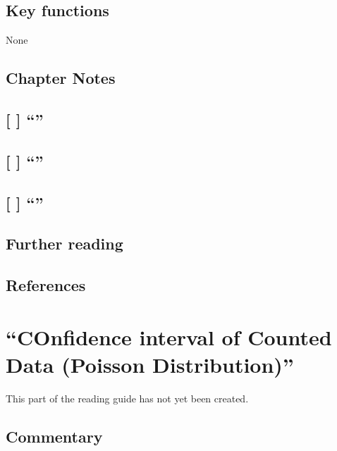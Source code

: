 \documentclass[]{book}
\theoremstyle{definition}
\theoremstyle{definition}
\theoremstyle{definition}
\theoremstyle{remark}
\begin{document}
\section*{Key functions}\label{key-functions-3}

None

\section*{Chapter Notes}\label{chapter-notes-4}

\section{\texorpdfstring{{[} {]} ``''}{{[} {]} }}\label{section-3}

\section{\texorpdfstring{{[} {]} ``''}{{[} {]} }}\label{section-4}

\section{\texorpdfstring{{[} {]} ``''}{{[} {]} }}\label{section-5}

\section*{Further reading}\label{further-reading-3}

\section*{References}\label{references-3}

\chapter{\texorpdfstring{``COnfidence interval of Counted Data (Poisson
Distribution)''}{COnfidence interval of Counted Data (Poisson Distribution)}}\label{ch6}

This part of the reading guide has not yet been created.

\section*{Commentary}\label{commentary-4}
\end{document}
